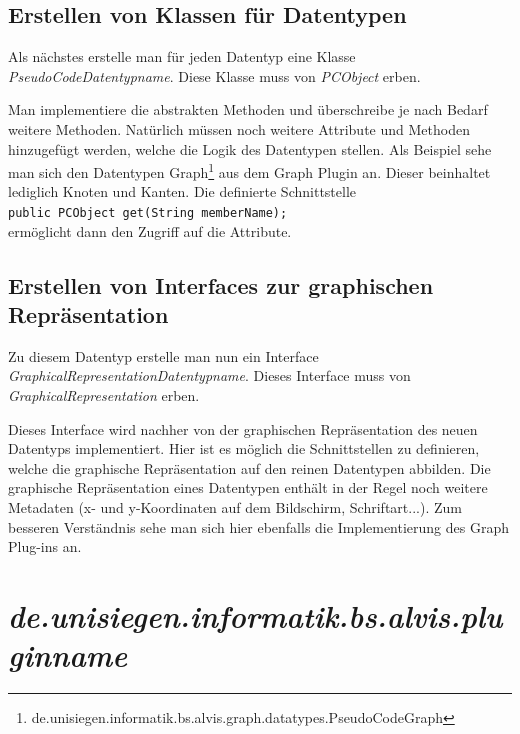 \documentclass[10pt,a4paper]{article}
\begin{document}
\subsection{Erstellen von Klassen für Datentypen}
Als nächstes erstelle man für jeden Datentyp eine Klasse \textit{PseudoCodeDatentypname}. Diese Klasse muss von \textit{PCObject} erben.

\lstset{language=java}


Man implementiere die abstrakten Methoden und überschreibe je nach Bedarf weitere Methoden. Natürlich müssen noch weitere Attribute und Methoden hinzugefügt werden, welche die Logik des Datentypen stellen.
Als Beispiel sehe man sich den Datentypen Graph\footnote{de.unisiegen.informatik.bs.alvis.graph.datatypes.PseudoCodeGraph} aus dem Graph Plugin an. Dieser beinhaltet lediglich Knoten und Kanten. 
Die definierte Schnittstelle\\
\lstinline{public PCObject get(String memberName);}\\
ermöglicht dann den Zugriff auf die Attribute.

\subsection{Erstellen von Interfaces zur graphischen Repräsentation}
Zu diesem Datentyp erstelle man nun ein Interface \textit{GraphicalRepresentationDatentypname}. Dieses Interface muss von \textit{GraphicalRepresentation} erben.

\lstset{language=java}


Dieses Interface wird nachher von der graphischen Repräsentation des neuen Datentyps implementiert. Hier ist es möglich die Schnittstellen zu definieren, welche die graphische Repräsentation auf den reinen Datentypen abbilden. Die graphische Repräsentation eines Datentypen enthält in der Regel noch weitere Metadaten (x- und y-Koordinaten auf dem Bildschirm, Schriftart...). Zum besseren Verständnis sehe man sich hier ebenfalls die Implementierung des Graph Plug-ins an.

\section{\textit{de.unisiegen.informatik.bs.alvis.pluginname}}
\end{document}
